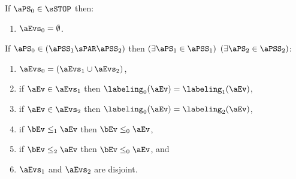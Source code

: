 \begin{definition}
  If $\aPS_0\in\sSTOP$ then:
  \begin{enumerate}
    \item $\aEvs_0 = \emptyset$.
  \end{enumerate}

  \noindent
  If $\aPS_0 \in (\aPSS_1\sPAR\aPSS_2)$ then  
  $(\exists\aPS_1\in\aPSS_1)$ $(\exists\aPS_2\in\aPSS_2)$:
  \begin{enumerate}
  \item $\aEvs_0 = (\aEvs_1\cup\aEvs_2)$,
  \item if $\aEv\in\aEvs_1$ then $\labeling_0(\aEv) = \labeling_1(\aEv)$, 
  \item if $\aEv\in\aEvs_2$ then $\labeling_0(\aEv) = \labeling_2(\aEv)$,
  \item if $\bEv\le_1\aEv$ then $\bEv\le_0\aEv$, 
  \item if $\bEv\le_2\aEv$ then $\bEv\le_0\aEv$, and
    \setcounter{pomsetParXount}{\value{enumi}}
  \item $\aEvs_1$ and $\aEvs_2$ are disjoint.
    \setcounter{pomsetParDisjointXount}{\value{enumi}}
  \end{enumerate}



\end{definition}
